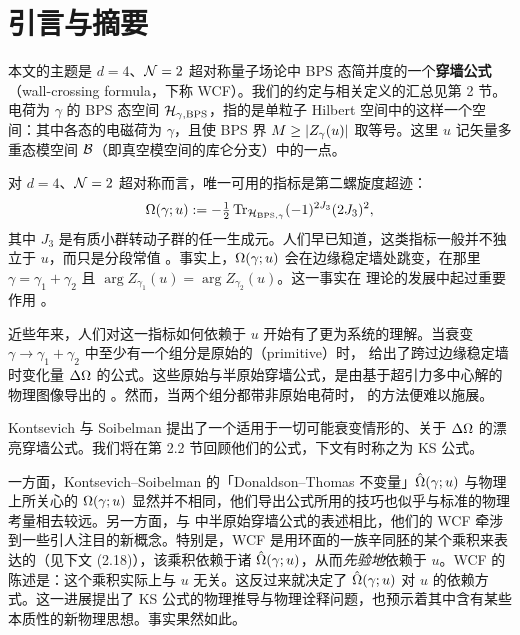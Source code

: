 \section{引言与摘要}
\label{sec:Introduction}

本文的主题是 $d=4$、$\mathcal{N}=2$ 超对称量子场论中 BPS 态简并度的一个\textbf{穿墙公式}（wall-crossing formula，下称 WCF）。我们的约定与相关定义的汇总见第 2 节。电荷为 $\gamma$ 的 BPS 态空间 $\mathcal{H}_{\gamma,\mathrm{BPS}}$，指的是单粒子 Hilbert 空间中的这样一个空间：其中各态的电磁荷为 $\gamma$，且使 BPS 界 $M \geq \lvert Z_\gamma(u) \rvert$ 取等号。这里 $u$ 记矢量多重态模空间 $\mathcal{B}$（即真空模空间的库仑分支）中的一点。

对 $d=4$、$\mathcal{N}=2$ 超对称而言，唯一可用的指标是第二螺旋度超迹：
\begin{equation} \label{eq:index}
\Omega(\gamma;u) := -\tfrac{1}{2}\,{\operatorname{Tr}}_{\mathcal{H}_{\mathrm{BPS},\gamma}}(-1)^{2J_3}(2J_3)^2,
\end{equation}
其中 $J_3$ 是有质小群转动子群的任一生成元。人们早已知道，这类指标一般并不独立于 $u$，而只是分段常值 \cite{Cecotti:1992qh}。事实上，$\Omega(\gamma;u)$ 会在边缘稳定墙处跳变，在那里 $\gamma=\gamma_1+\gamma_2$ 且 $\arg Z_{\gamma_1}(u)=\arg Z_{\gamma_2}(u)$。这一事实在 \SW 理论的发展中起过重要作用 \cite{Seiberg:1994rs,Seiberg:1994aj}。

近些年来，人们对这一指标如何依赖于 $u$ 开始有了更为系统的理解。当衰变 $\gamma\to\gamma_1+\gamma_2$ 中至少有一个组分是原始的（primitive）时，\cite{Denef:2007vg} 给出了跨过边缘稳定墙时变化量 $\Delta\Omega$ 的公式。这些原始与半原始穿墙公式，是由基于超引力多中心解的物理图像导出的 \cite{Denef:2000nb,Denef:2000ar}。然而，当两个组分都带非原始电荷时，\cite{Denef:2007vg} 的方法便难以施展。

Kontsevich 与 Soibelman \cite{ks1} 提出了一个适用于一切可能衰变情形的、关于 $\Delta\Omega$ 的漂亮穿墙公式。我们将在第 2.2 节回顾他们的公式，下文有时称之为 KS 公式。

一方面，Kontsevich--Soibelman 的「Donaldson--Thomas 不变量」$\hat{\Omega}(\gamma;u)$ 与物理上所关心的 $\Omega(\gamma;u)$ 显然并不相同，他们导出公式所用的技巧也似乎与标准的物理考量相去较远。另一方面，与 \cite{Denef:2007vg} 中半原始穿墙公式的表述相比，他们的 WCF 牵涉到一些引人注目的新概念。特别是，WCF 是用环面的一族辛同胚的某个乘积来表达的（见下文 (2.18)），该乘积依赖于诸 $\hat{\Omega}(\gamma;u)$，从而\emph{先验地}依赖于 $u$。WCF 的陈述是：这个乘积实际上与 $u$ 无关。这反过来就决定了 $\hat{\Omega}(\gamma;u)$ 对 $u$ 的依赖方式。这一进展提出了 KS 公式的物理推导与物理诠释问题，也预示着其中含有某些本质性的新物理思想。事实果然如此。

